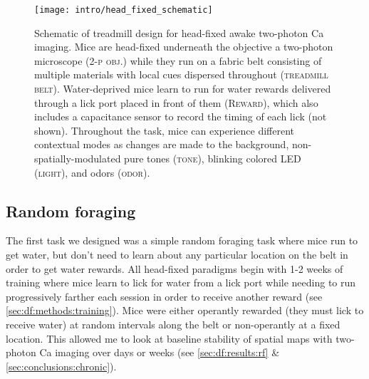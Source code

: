 \begin{figure}
	\centering
	\texttt{[image: intro/head\_fixed\_schematic]}
	\caption[Schematic of treadmill design for head-fixed awake two-photon Ca imaging]{Schematic of treadmill design for head-fixed awake two-photon Ca imaging.
	Mice are head-fixed underneath the objective a two-photon microscope (\textsc{2-p obj.}) while they run on a fabric belt consisting of multiple materials with local cues dispersed throughout (\textsc{treadmill belt}).
	Water-deprived mice learn to run for water rewards delivered through a lick port placed in front of them (\textsc{Reward}), which also includes a capacitance sensor to record the timing of each lick (not shown).
	Throughout the task, mice can experience different contextual modes as changes are made to the background, non-spatially-modulated pure tones (\textsc{tone}), blinking colored LED (\textsc{light}), and odors (\textsc{odor}).
	}
	\label{fig:intro:techniques:treadmill_schematic}
\end{figure}

\subsection{Random foraging}
The first task we designed was a simple random foraging task where mice run to get water, but don't need to learn about any particular location on the belt in order to get water rewards.
All head-fixed paradigms begin with 1-2 weeks of training where mice learn to lick for water from a lick port while needing to run progressively farther each session in order to receive another reward (see \autoref{sec:df:methods:training}).
Mice were either operantly rewarded (they must lick to receive water) at random intervals along the belt or non-operantly at a fixed location.
This allowed me to look at baseline stability of spatial maps with two-photon Ca imaging over days or weeks (see \autoref{sec:df:results:rf} \& \autoref{sec:conclusions:chronic}).

